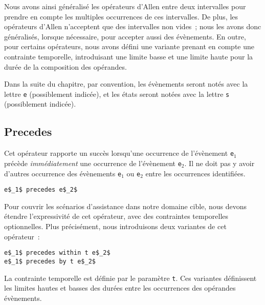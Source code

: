 
Nous avons ainsi généralisé les opérateurs d'Allen entre deux
intervalles pour prendre en compte les multiples occurrences de ces
intervalles. De plus, les opérateurs d'Allen n'acceptent que des
intervalles non vides~; nous les avons donc généralisés, lorsque
nécessaire, pour accepter aussi des évènements.  En outre, pour
certains opérateurs, nous avons défini une variante prenant en compte
une contrainte temporelle, introduisant une limite basse et une limite
haute pour la durée de la composition des opérandes.

Dans la suite du chapitre, par convention, les évènements
seront notés avec la lettre {\tt e} (possiblement indicée), et les états 
seront notées avec la lettre {\tt s} (possiblement indicée).

\subsection{Precedes}
Cet opérateur rapporte un succès lorsqu'une occurrence de l'évènement 
{\tt e$_1$} précède {\em immédiatement} une occurrence de l'évènement {\tt e$_2$}. 
Il ne doit pas y avoir d'autres occurrence des évènements {\tt e$_1$} ou 
{\tt e$_2$} entre les occurrences identifiées. 
\begin{lstlisting}[language=MaloyaText]
e$_1$ precedes e$_2$
\end{lstlisting}
Pour couvrir les scénarios d'assistance dans notre domaine cible, nous
devons étendre l'expressivité de cet opérateur, avec des contraintes
temporelles optionnelles. Plus précisément, nous introduisons deux
variantes de cet opérateur~:
\begin{lstlisting}[language=MaloyaText]
e$_1$ precedes within t e$_2$
e$_1$ precedes by t e$_2$
\end{lstlisting}
La contrainte temporelle est définie par le paramètre {\tt t}. Ces
variantes définissent les limites hautes et basses des durées entre
les occurrences des opérandes évènements.

